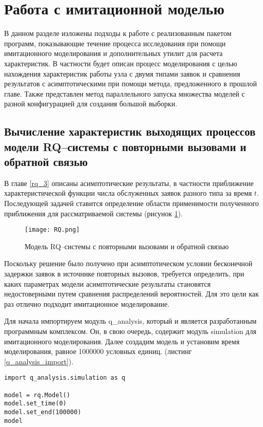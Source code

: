 \section{Работа с имитационной моделью}
В данном разделе изложены подходы к работе с реализованным пакетом программ, показывающие течение процесса исследования при помощи имитационного моделирования и дополнительных утилит для расчета характеристик. В частности будет описан процесс моделирования с целью нахождения характеристик работы узла с двумя типами заявок и сравнения результатов с асимптотическими при помощи метода, предложенного в прошлой главе. Также представлен метод параллельного запуска множества моделей с разной конфигурацией для создания большой выборки.
\subsection{Вычисление характеристик выходящих процессов модели RQ--системы с повторными вызовами и обратной связью}

В главе \ref{rq_3} описаны асимптотические результаты, в частности приближение характеристической функции числа обслуженных заявок разного типа за время $t$. Последующей задачей ставится определение области применимости полученного приближения для рассматриваемой системы (рисунок \ref{rq_system}). 

\begin{figure}[H]
	\centering
	\texttt{[image: RQ.png]}
	\caption{Модель RQ--системы с повторными вызовами и обратной связью} \label{rq_system}
\end{figure}

Поскольку решение было получено при асимптотическом условии бесконечной задержки заявок в источнике повторных вызовов, требуется определить, при каких параметрах модели асимптотические результаты становятся недостоверными путем сравнения распределений вероятностей. Для это цели как раз отлично подходит имитационное моделирование.

Для начала импортируем модуль q\_analysis, который и является разработанным программным комплексом. Он, в свою очередь, содержит модуль simulation для имитационного моделирования. Далее создадим модель и установим время моделирования, равное 1000000 условных единиц. (листинг \ref{q_analysis_import}).
\begin{lstlisting}
import q_analysis.simulation as q

model = rq.Model()
model.set_time(0) 
model.set_end(100000)
model
\end{lstlisting}


